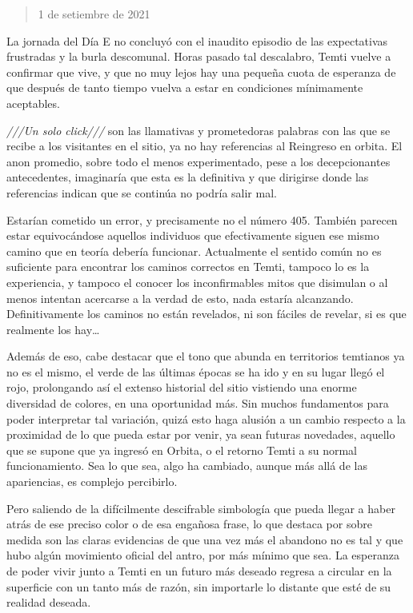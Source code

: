 \documentclass[
  spanish,
]{book}
\begin{document}
\begin{quote}
1 de setiembre de 2021
\end{quote}

La jornada del Día E no concluyó con el inaudito episodio de las expectativas frustradas y la burla descomunal. Horas pasado tal descalabro, Temti vuelve a confirmar que vive, y que no muy lejos hay una pequeña cuota de esperanza de que después de tanto tiempo vuelva a estar en condiciones mínimamente aceptables.

\emph{///Un solo click///} son las llamativas y prometedoras palabras con las que se recibe a los visitantes en el sitio, ya no hay referencias al Reingreso en orbita. El anon promedio, sobre todo el menos experimentado, pese a los decepcionantes antecedentes, imaginaría que esta es la definitiva y que dirigirse donde las referencias indican que se continúa no podría salir mal.

Estarían cometido un error, y precisamente no el número 405. También parecen estar equivocándose aquellos individuos que efectivamente siguen ese mismo camino que en teoría debería funcionar.
Actualmente el sentido común no es suficiente para encontrar los caminos correctos en Temti, tampoco lo es la experiencia, y tampoco el conocer los inconfirmables mitos que disimulan o al menos intentan acercarse a la verdad de esto, nada estaría alcanzando. Definitivamente los caminos no están revelados, ni son fáciles de revelar, si es que realmente los hay\ldots{}

Además de eso, cabe destacar que el tono que abunda en territorios temtianos ya no es el mismo, el verde de las últimas épocas se ha ido y en su lugar llegó el rojo, prolongando así el extenso historial del sitio vistiendo una enorme diversidad de colores, en una oportunidad más. Sin muchos fundamentos para poder interpretar tal variación, quizá esto haga alusión a un cambio respecto a la proximidad de lo que pueda estar por venir, ya sean futuras novedades, aquello que se supone que ya ingresó en Orbita, o el retorno Temti a su normal funcionamiento. Sea lo que sea, algo ha cambiado, aunque más allá de las apariencias, es complejo percibirlo.

Pero saliendo de la difícilmente descifrable simbología que pueda llegar a haber atrás de ese preciso color o de esa engañosa frase, lo que destaca por sobre medida son las claras evidencias de que una vez más el abandono no es tal y que hubo algún movimiento oficial del antro, por más mínimo que sea. La esperanza de poder vivir junto a Temti en un futuro más deseado regresa a circular en la superficie con un tanto más de razón, sin importarle lo distante que esté de su realidad deseada.
\end{document}
